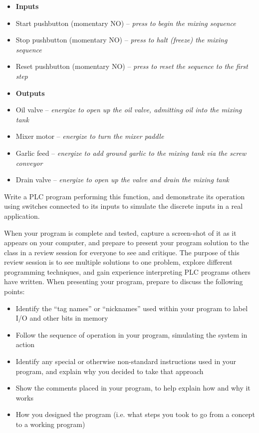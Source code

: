 \begin{itemize}
\item{} {\bf Inputs} 
\item{} Start pushbutton (momentary NO) -- {\it press to begin the mixing sequence}
\item{} Stop pushbutton (momentary NO) -- {\it press to halt (freeze) the mixing sequence}
\item{} Reset pushbutton (momentary NO) -- {\it press to reset the sequence to the first step}
\end{itemize}

\begin{itemize}
\item{} {\bf Outputs} 
\item{} Oil valve -- {\it energize to open up the oil valve, admitting oil into the mixing tank}
\item{} Mixer motor -- {\it energize to turn the mixer paddle}
\item{} Garlic feed -- {\it energize to add ground garlic to the mixing tank via the screw conveyor}
\item{} Drain valve -- {\it energize to open up the valve and drain the mixing tank}
\end{itemize}

\filbreak

Write a PLC program performing this function, and demonstrate its operation using switches connected to its inputs to simulate the discrete inputs in a real application.  

\vskip 10pt

When your program is complete and tested, capture a screen-shot of it as it appears on your computer, and prepare to present your program solution to the class in a review session for everyone to see and critique.  The purpose of this review session is to see multiple solutions to one problem, explore different programming techniques, and gain experience interpreting PLC programs others have written.  When presenting your program, prepare to discuss the following points:

\begin{itemize}
\item{} Identify the ``tag names'' or ``nicknames'' used within your program to label I/O and other bits in memory
\item{} Follow the sequence of operation in your program, simulating the system in action
\item{} Identify any special or otherwise non-standard instructions used in your program, and explain why you decided to take that approach
\item{} Show the comments placed in your program, to help explain how and why it works
\item{} How you designed the program (i.e. what steps you took to go from a concept to a working program)
\end{itemize}

